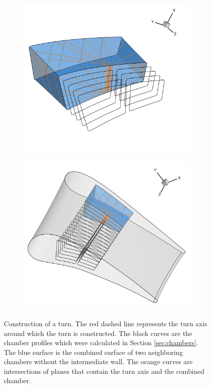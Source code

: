 \documentclass[a4paper, 11pt]{report}
\theoremstyle{definition}
\begin{document}
	\begin{figure}[H]
		\centering
		\begin{subfigure}{.62\textwidth}
			\includegraphics[width=\textwidth]{../tec/channel/11.png}
		\end{subfigure}
		\begin{subfigure}{.37\textwidth}
			\includegraphics[width=\textwidth]{../tec/channel/12.png}
			\vspace{1.2cm}
		\end{subfigure}
		\caption{Construction of a turn. The red dashed line represents the turn axis around which the turn is constructed. The black curves are the chamber profiles which were calculated in Section \ref{sec:chambers}. The blue surface is the combined surface of two neighboring chambers without the intermediate wall. The orange curves are intersections of planes that contain the turn axis and the combined chamber.}
	\end{figure}
\end{document}
